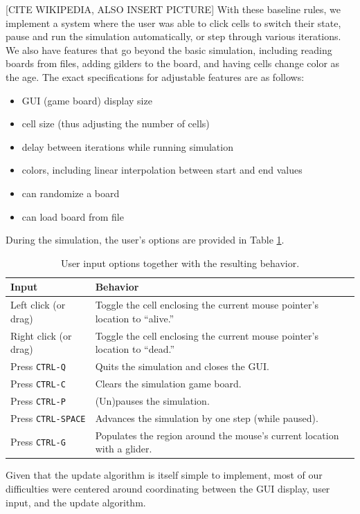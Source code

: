 \documentclass[onecolumn,12pt]{IEEEtran}
\begin{document}
  [CITE WIKIPEDIA, ALSO INSERT PICTURE] With these baseline rules, we implement a
  system where the user was able to click cells to switch their state, pause and
  run the simulation automatically, or step through various iterations. We also
  have features that go beyond the basic simulation, including reading boards
  from files, adding gilders to the board, and having cells change color as the
  age. The exact specifications for adjustable features are as follows:
  \begin{itemize}
    \item GUI (game board) display size
    \item cell size (thus adjusting the number of cells) 
    \item delay between iterations while running simulation
    \item colors, including linear interpolation between start and end values
    \item can randomize a board
    \item can load board from file
  \end{itemize} 
  During the simulation, the user's options are provided in Table
  \ref{tab:gui}.
  \begin{table}
    \centering
    \begin{tabular}[b]{@{}lp{10cm}@{}} \toprule
      Input & Behavior \\ \midrule
      Left click (or drag) & Toggle the cell enclosing the current mouse
      pointer's location to ``alive.'' \\
      Right click (or drag) & Toggle the cell enclosing the current mouse
      pointer's location to ``dead.'' \\
      Press \texttt{CTRL-Q} & Quits the simulation and closes the GUI. \\
      Press \texttt{CTRL-C} & Clears the simulation game board. \\
      Press \texttt{CTRL-P} & (Un)pauses the simulation. \\
      Press \texttt{CTRL-SPACE} & Advances the simulation by one step (while
      paused). \\
      Press \texttt{CTRL-G} & Populates the region around the mouse's current
      location with a glider. \\ \bottomrule
    \end{tabular}
    \caption{User input options together with the resulting behavior.}
    \label{tab:gui}
  \end{table}
  Given that the update algorithm is itself simple to implement, most of our
  difficulties were centered around coordinating between the GUI display, user
  input, and the update algorithm.	
\end{document}
